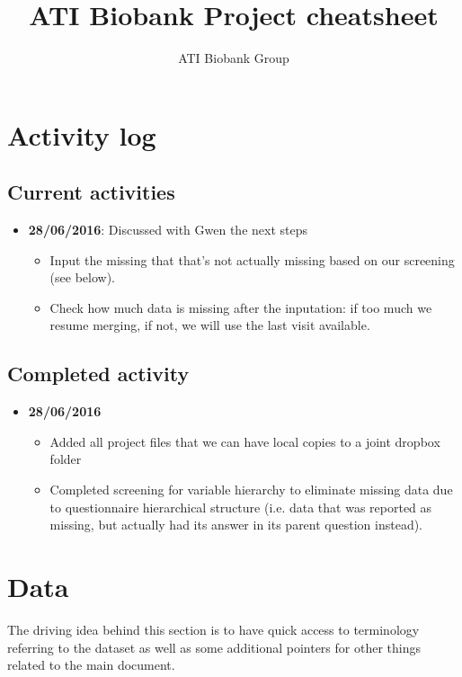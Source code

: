 \documentclass{article}
\begin{document}
\title{ATI Biobank Project cheatsheet}

\author{ATI Biobank Group}

\maketitle

\section{Activity log}

\subsection{Current activities}
\begin{itemize}
\item {\bf 28/06/2016}: Discussed with Gwen the next steps
  \begin{itemize}
  \item Input the missing that that's not actually missing based on our screening (see below).
  \item Check how much data is missing after the inputation: if too much we resume merging, if not, we will use the last visit available.
  \end{itemize}
\end{itemize}

\subsection{Completed activity}
\begin{itemize}
\item {\bf 28/06/2016}
  \begin{itemize}
  \item Added all project files that we can have local copies to a joint dropbox folder
  \item Completed screening for variable hierarchy to eliminate missing data due to questionnaire hierarchical structure (i.e. data that was reported as missing, but actually had its answer in its parent question instead).
  \end{itemize}
\end{itemize}

\section{Data\label{sec:data}}
The driving idea behind this section is to have quick access to terminology referring to the dataset as well as some additional pointers for other things related to the main document.
\end{document}
